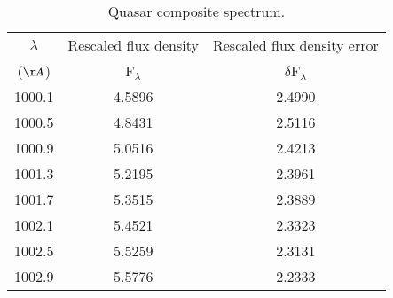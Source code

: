 \begin{table}
\centering
\begin{center}
\caption{Quasar composite spectrum.}
\begin{tabular}{ccc}
\hline
\hline
\noalign{\smallskip}
$\lambda$ &  Rescaled flux density & Rescaled flux density error \\  
(${\AA}$) & F$_{\lambda}$ & $\delta$F$_{\lambda}$ \\
\hline


1000.1 & 4.5896 & 2.4990 \\
1000.5 & 4.8431 & 2.5116 \\
1000.9 & 5.0516 & 2.4213 \\
1001.3 & 5.2195 & 2.3961 \\
1001.7 & 5.3515 & 2.3889 \\
1002.1 & 5.4521 & 2.3323 \\
1002.5 & 5.5259 & 2.3131 \\
1002.9 & 5.5776 & 2.2333 \\



\hline
\hline
\end{tabular}
\end{center}


\end{table}



